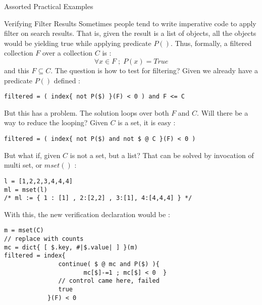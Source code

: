 \begin{section}{Assorted Practical Examples}
\begin{subsection}{Verifying Filter Results}
Sometimes people tend to write imperative code to apply filter on search results.
That is, given the result is a list of objects, all the objects would be yielding true
while applying predicate $P()$. Thus, formally, a filtered collection $F$ over a collection $C$ is :
$$
\forall x \in F \; ; \; P(x)  = True 
$$
and this $F \subseteq C$. The question is how to test for filtering?
Given we already have a predicate $P()$ defined :
 
\begin{center}\begin{minipage}{\linewidth}
\begin{lstlisting}[style=JexlStyle]
filtered = ( index{ not P($) }(F) < 0 ) and F <= C  
\end{lstlisting}  
\end{minipage}\end{center}
But this has a problem. The solution loops over both $F$ and $C$. 
Will there be a way to reduce the looping? Given $C$ is a set, it is easy :

\begin{center}\begin{minipage}{\linewidth}
\begin{lstlisting}[style=JexlStyle]
filtered = ( index{ not P($) and not $ @ C }(F) < 0 )
\end{lstlisting}  
\end{minipage}\end{center}

But what if, given $C$ is not a set, but a list? That can be solved by
invocation of multi set, or $mset()$  :
\begin{center}\begin{minipage}{\linewidth}
\begin{lstlisting}[style=JexlStyle]
l = [1,2,2,3,4,4,4]
ml = mset(l)
/* ml := { 1 : [1] , 2:[2,2] , 3:[1], 4:[4,4,4] } */
\end{lstlisting}  
\end{minipage}\end{center}
With this, the new verification declaration would be :

\begin{center}\begin{minipage}{\linewidth}
\begin{lstlisting}[style=JexlStyle]
m = mset(C)
// replace with counts 
mc = dict{ [ $.key, #|$.value| ] }(m)
filtered = index{ 
               continue( $ @ mc and P($) ){  
                      mc[$]-=1 ; mc[$] < 0  }
               // control came here, failed         
               true    
            }(F) < 0 
\end{lstlisting}  
\end{minipage}\end{center}
 

\end{subsection}
\end{section}
